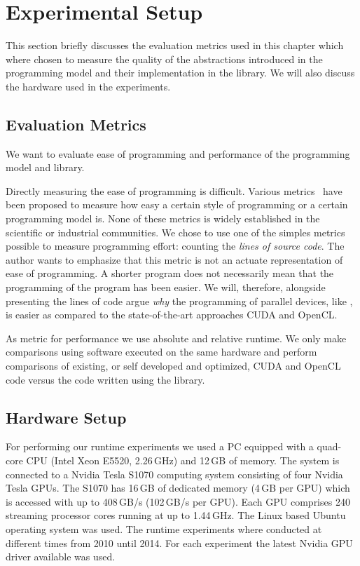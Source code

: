 \section{Experimental Setup}
This section briefly discusses the evaluation metrics used in this chapter which where chosen to measure the quality of the abstractions introduced in the \SkelCL programming model and their implementation in the \SkelCL library.
We will also discuss the hardware used in the experiments.


\subsection{Evaluation Metrics}
We want to evaluate ease of programming and performance of the \SkelCL programming model and library.

Directly measuring the ease of programming is difficult.
Various metrics~\cite{} have been proposed to measure how easy a certain style of programming or a certain programming model is.
None of these metrics is widely established in the scientific or industrial communities.
We chose to use one of the simples metrics possible to measure programming effort: counting the \emph{lines of source code}.
The author wants to emphasize that this metric is not an actuate representation of ease of programming.
A shorter program does not necessarily mean that the programming of the program has been easier.
We will, therefore, alongside presenting the lines of code argue \emph{why} the programming of parallel devices, like \GPUs, is easier as compared to the state-of-the-art approaches CUDA and OpenCL.

As metric for performance we use absolute and relative runtime.
We only make comparisons using software executed on the same hardware and perform comparisons of existing, or self developed and optimized, CUDA and OpenCL code versus the code written using the \SkelCL library.

\subsection{Hardware Setup}
For performing our runtime experiments we used a PC equipped with a quad-core CPU (Intel Xeon E5520, 2.26\,GHz) and 12\,GB of memory.
The system is connected to a Nvidia Tesla S1070 computing system consisting of four Nvidia Tesla GPUs.
The S1070 has 16\,GB of dedicated memory (4\,GB per GPU) which is accessed with up to 408\,GB/s (102\,GB/s per GPU).
Each GPU comprises 240 streaming processor cores running at up to 1.44\,GHz.
The Linux based Ubuntu operating system was used.
The runtime experiments where conducted at different times from 2010 until 2014.
For each experiment the latest Nvidia GPU driver available was used.

